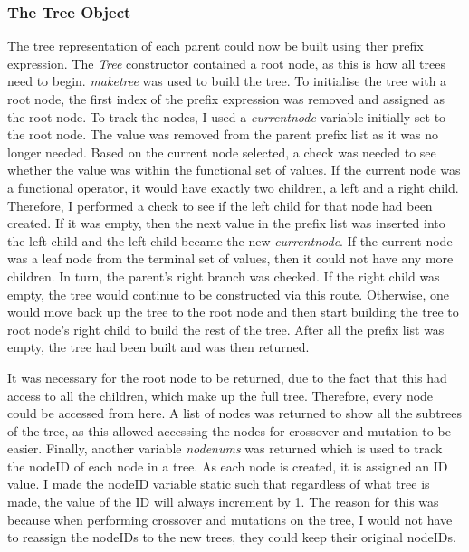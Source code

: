 \documentclass[11pt]{article}
\begin{document}
\subsubsection{The Tree Object}\label{subsubsec:tree}
The tree representation of each parent could now be built using ther prefix expression. The \textit{Tree} constructor contained a root node, as this is how all trees need to begin. \textit{make\textunderscore tree} was used to build the tree. To initialise the tree with a root node, the first index of the prefix expression was removed and assigned as the root node. To track the nodes, I used a \textit{current\textunderscore node} variable initially set to the root node.
The value was removed from the parent prefix list as it was no longer needed. Based on the current node selected, a check was needed to see whether the value was within the functional set of values. If the current node was a functional operator,  it would have exactly two children, a left and a right child. Therefore, I performed a check to see if the left child for that node had been created. If it was empty, then the next value in the prefix list was inserted into the left child and the left child became the new \textit{current\textunderscore node}. If the current node was a leaf node from the terminal set of values, then it could not have any more children. In turn, the parent's right branch was checked. If the right child was empty, the tree would continue to be constructed via this route. Otherwise, one would move back up the tree to the root node and then start building the tree to root node's right child to build the rest of the tree. After all the prefix list was empty, the tree had been built and was then returned. 

It was necessary for the root node to be returned, due to the fact that this had access to all the children, which make up the full tree. Therefore, every node could be accessed from here. A list of nodes was returned to show all the subtrees of the tree, as this allowed accessing the nodes for crossover and mutation to be easier. Finally, another variable \textit{nodenums} was returned which is used to track the nodeID of each node in a tree. As each node is created, it is assigned an ID value. I made the nodeID variable static such that regardless of what tree is made, the value of the ID will always increment by 1. The reason for this was because when performing crossover and mutations on the tree, I would not have to reassign the nodeIDs to the new trees, they could keep their original nodeIDs.
\end{document}

